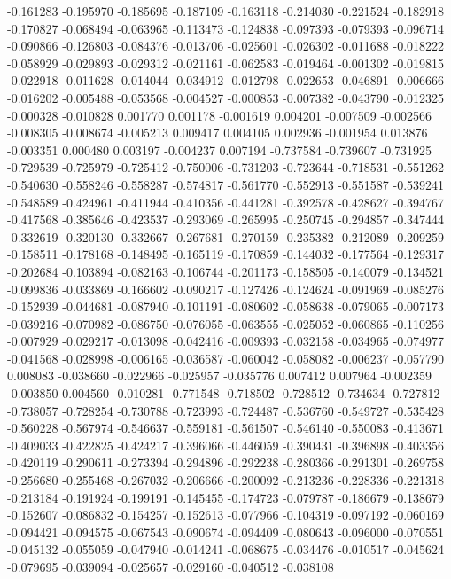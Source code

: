 -0.161283
-0.195970
-0.185695
-0.187109
-0.163118
-0.214030
-0.221524
-0.182918
-0.170827
-0.068494
-0.063965
-0.113473
-0.124838
-0.097393
-0.079393
-0.096714
-0.090866
-0.126803
-0.084376
-0.013706
-0.025601
-0.026302
-0.011688
-0.018222
-0.058929
-0.029893
-0.029312
-0.021161
-0.062583
-0.019464
-0.001302
-0.019815
-0.022918
-0.011628
-0.014044
-0.034912
-0.012798
-0.022653
-0.046891
-0.006666
-0.016202
-0.005488
-0.053568
-0.004527
-0.000853
-0.007382
-0.043790
-0.012325
-0.000328
-0.010828
0.001770
0.001178
-0.001619
0.004201
-0.007509
-0.002566
-0.008305
-0.008674
-0.005213
0.009417
0.004105
0.002936
-0.001954
0.013876
-0.003351
0.000480
0.003197
-0.004237
0.007194
-0.737584
-0.739607
-0.731925
-0.729539
-0.725979
-0.725412
-0.750006
-0.731203
-0.723644
-0.718531
-0.551262
-0.540630
-0.558246
-0.558287
-0.574817
-0.561770
-0.552913
-0.551587
-0.539241
-0.548589
-0.424961
-0.411944
-0.410356
-0.441281
-0.392578
-0.428627
-0.394767
-0.417568
-0.385646
-0.423537
-0.293069
-0.265995
-0.250745
-0.294857
-0.347444
-0.332619
-0.320130
-0.332667
-0.267681
-0.270159
-0.235382
-0.212089
-0.209259
-0.158511
-0.178168
-0.148495
-0.165119
-0.170859
-0.144032
-0.177564
-0.129317
-0.202684
-0.103894
-0.082163
-0.106744
-0.201173
-0.158505
-0.140079
-0.134521
-0.099836
-0.033869
-0.166602
-0.090217
-0.127426
-0.124624
-0.091969
-0.085276
-0.152939
-0.044681
-0.087940
-0.101191
-0.080602
-0.058638
-0.079065
-0.007173
-0.039216
-0.070982
-0.086750
-0.076055
-0.063555
-0.025052
-0.060865
-0.110256
-0.007929
-0.029217
-0.013098
-0.042416
-0.009393
-0.032158
-0.034965
-0.074977
-0.041568
-0.028998
-0.006165
-0.036587
-0.060042
-0.058082
-0.006237
-0.057790
0.008083
-0.038660
-0.022966
-0.025957
-0.035776
0.007412
0.007964
-0.002359
-0.003850
0.004560
-0.010281
-0.771548
-0.718502
-0.728512
-0.734634
-0.727812
-0.738057
-0.728254
-0.730788
-0.723993
-0.724487
-0.536760
-0.549727
-0.535428
-0.560228
-0.567974
-0.546637
-0.559181
-0.561507
-0.546140
-0.550083
-0.413671
-0.409033
-0.422825
-0.424217
-0.396066
-0.446059
-0.390431
-0.396898
-0.403356
-0.420119
-0.290611
-0.273394
-0.294896
-0.292238
-0.280366
-0.291301
-0.269758
-0.256680
-0.255468
-0.267032
-0.206666
-0.200092
-0.213236
-0.228336
-0.221318
-0.213184
-0.191924
-0.199191
-0.145455
-0.174723
-0.079787
-0.186679
-0.138679
-0.152607
-0.086832
-0.154257
-0.152613
-0.077966
-0.104319
-0.097192
-0.060169
-0.094421
-0.094575
-0.067543
-0.090674
-0.094409
-0.080643
-0.096000
-0.070551
-0.045132
-0.055059
-0.047940
-0.014241
-0.068675
-0.034476
-0.010517
-0.045624
-0.079695
-0.039094
-0.025657
-0.029160
-0.040512
-0.038108
